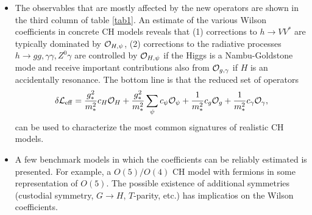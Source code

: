 \documentclass[../report.tex]{subfiles}
\begin{document}
\begin{itemize}
\item The observables that are mostly affected by the new operators are shown in the third column of table \ref{tab1}. An estimate of the various Wilson coefficients in concrete CH models reveals that (1) corrections to $h\to VV^*$ are typically dominated by ${\cal O}_{H,\psi}$, (2) corrections to the radiative processes $h\to gg,\gamma\gamma,Z^0\gamma$ are controlled by ${\cal O}_{H,\psi}$ if the Higgs is a Nambu-Goldstone mode and receive important contributions also from ${\cal O}_{g,\gamma}$ if $H$ is an accidentally resonance. The bottom line is that the reduced set of operators 
\begin{eqnarray}\label{SMEFT}
\delta{\cal L}_{\rm eff}=\frac{g_*^2}{m_*^2}c_H{\cal O}_H+\frac{g_*^2}{m_*^2}\sum_\psi c_\psi{\cal O}_\psi+\frac{1}{m_*^2}c_g{\cal O}_g+\frac{1}{m_*^2}c_\gamma{\cal O}_\gamma,
\end{eqnarray}
can be used to characterize the most common signatures of realistic CH models.
\item A few benchmark models in which the coefficients can be reliably estimated is presented. For example, a $O(5)/O(4)$ CH model with fermions in some representation of $O(5)$. The possible existence of additional symmetries (custodial symmetry, $G\to H$, $T$-parity, etc.) has implicatios on the Wilson coefficients.


\end{itemize}
\end{document}
